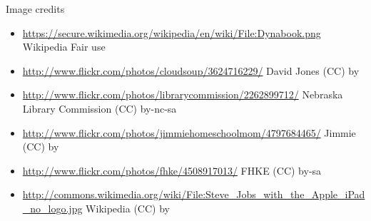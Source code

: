 \begin{frame}{Image credits}
  \tiny
  \begin{itemize}
    \item \url{https://secure.wikimedia.org/wikipedia/en/wiki/File:Dynabook.png} Wikipedia Fair use
    \item \url{http://www.flickr.com/photos/cloudsoup/3624716229/} David Jones (CC) by
    \item \url{http://www.flickr.com/photos/librarycommission/2262899712/} Nebraska Library Commission (CC) by-nc-sa
    \item \url{http://www.flickr.com/photos/jimmiehomeschoolmom/4797684465/} Jimmie (CC) by
    \item \url{http://www.flickr.com/photos/fhke/4508917013/} FHKE (CC) by-sa
    \item \url{http://commons.wikimedia.org/wiki/File:Steve_Jobs_with_the_Apple_iPad_no_logo.jpg} Wikipedia (CC) by
  \end{itemize}
\end{frame}
